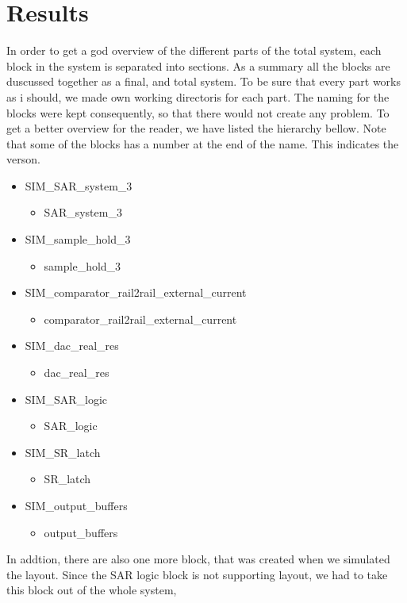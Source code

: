 \documentclass[english, 12pt, a4paper]{article}
\begin{document}
\section{Results} 
In order to get a god overview of the different parts of the total system, each block in the system is separated into sections. As a summary all the blocks are duscussed together as a final, and 
total system. To be sure that every part works as i should, we made own working directoris for each part. The naming for the blocks were kept consequently, so that there would not create any problem. 
To get a better overview for the reader, we have listed the hierarchy bellow. Note that some of the blocks has a number at the end of the name. This indicates the verson. 
\begin{itemize}
 \item SIM\_SAR\_system\_3
 \begin{itemize}
  \item SAR\_system\_3
 \end{itemize}
 \item SIM\_sample\_hold\_3
 \begin{itemize}
  \item sample\_hold\_3
 \end{itemize}
 \item SIM\_comparator\_rail2rail\_external\_current
 \begin{itemize}
  \item comparator\_rail2rail\_external\_current
 \end{itemize}
 \item SIM\_dac\_real\_res
  \begin{itemize}
  \item dac\_real\_res
 \end{itemize}
 \item SIM\_SAR\_logic
  \begin{itemize}
  \item SAR\_logic
 \end{itemize}
 \item SIM\_SR\_latch
  \begin{itemize}
  \item SR\_latch
 \end{itemize}
 \item SIM\_output\_buffers
  \begin{itemize}
  \item output\_buffers
 \end{itemize}
\end{itemize}
In addtion, there are also one more block, that was created when we simulated the layout. Since the SAR logic block is not supporting layout, we had to take this block out of the whole system, 
\end{document}
